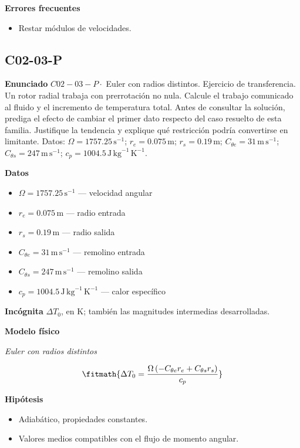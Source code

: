 \documentclass[10pt,openany]{book}
\begin{document}
\noindent\textbf{Errores frecuentes}
\begin{itemize}
\item Restar módulos de velocidades.
\end{itemize}
\subsection*{C02-03-P}

\noindent\textbf{Enunciado}
\(C02-03-P \cdot\) Euler con radios distintos. Ejercicio de transferencia. Un rotor radial trabaja con prerrotación no nula. Calcule el trabajo comunicado al fluido y el incremento de temperatura total. Antes de consultar la solución, prediga el efecto de cambiar el primer dato respecto del caso resuelto de esta familia. Justifique la tendencia y explique qué restricción podría convertirse en limitante. Datos: \(\Omega=1757.25\, \mathrm{s}^{-1}\); \(r_e=0.075\, \mathrm{m}\); \(r_s=0.19\, \mathrm{m}\); \(C_{\theta e}=31\, \mathrm{m}\,\mathrm{s}^{-1}\); \(C_{\theta s}=247\, \mathrm{m}\,\mathrm{s}^{-1}\); \(c_p=1004.5\, \mathrm{J}\,\mathrm{kg}^{-1}\,\mathrm{K}^{-1}\).

\noindent\textbf{Datos}
\begin{itemize}
\item $\Omega = 1757.25\,\mathrm{s}^{-1}$ — velocidad angular
\item $r_e = 0.075\,\mathrm{m}$ — radio entrada
\item $r_s = 0.19\,\mathrm{m}$ — radio salida
\item $C_{\theta e} = 31\,\mathrm{m}\,\mathrm{s}^{-1}$ — remolino entrada
\item $C_{\theta s} = 247\,\mathrm{m}\,\mathrm{s}^{-1}$ — remolino salida
\item $c_p = 1004.5\,\mathrm{J}\,\mathrm{kg}^{-1}\,\mathrm{K}^{-1}$ — calor específico
\end{itemize}

\noindent\textbf{Incógnita}
$\Delta T_0$, en $\mathrm{K}$; también las magnitudes intermedias desarrolladas.

\noindent\textbf{Modelo físico}

\noindent\textit{Euler con radios distintos}

\[
\fitmath{\Delta T_0=\frac{\Omega \left(- C_{\theta e} r_e + C_{\theta s} r_s\right)}{c_p}}
\]

\noindent\textbf{Hipótesis}
\begin{itemize}
\item Adiabático, propiedades constantes.
\item Valores medios compatibles con el flujo de momento angular.
\end{itemize}
\end{document}
